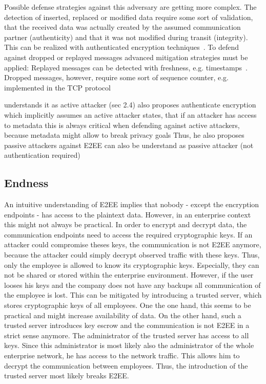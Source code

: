 \documentclass[../main.tex]{subfiles}
\begin{document}
Possible defense strategies against this adversary are getting more complex.
The detection of inserted, replaced or modified data require some sort of validation, that the received data was actually created by the assumed communication partner (authenticity) and that it was not modified during transit (integrity).
This can be realized with authenticated encryption techniques~\cite{Mallory2022}.
To defend against dropped or replayed messages advanced mitigation strategies must be applied:
Replayed messages can be detected with freshness, e.g. timestamps~\cite[419]{Eckert2018}.
Dropped messages, however, require some sort of sequence counter, e.g. implemented in the TCP protocol ~\cite[115]{Eckert2018}


\cite{Mallory2022} understands it as active attacker (sec 2.4)
\cite{Hale2022} also proposes authenticate encryption which implicitly assumes an active attacker
\cite{Nabeel2017} states, that if an attacker has access to metadata this is always critical when defending against active attackers, because metadata might allow to break privacy goals
Thus, he also proposes passive attackers against E2EE can also be understand as passive attacker (not authentication required)


\subsection{Endness}

An intuitive understanding of E2EE implies that nobody - except the encryption endpoints - has access to the plaintext data.
However, in an enterprise context this might not always be practical.
In order to encrypt and decrypt data, the communication endpoints need to access the required cryptographic keys.
If an attacker could compromise theses keys, the communication is not E2EE anymore, because the attacker could simply decrypt observed traffic with these keys.
Thus, only the employee is allowed to know its cryptographic keys.
Especially, they can not be shared or stored within the enterprise environment.
However, if the user looses his keys and the company does not have any backups all communication of the employee is lost.
This can be mitigated by introducing a trusted server, which stores cryptographic keys of all employees.
One the one hand, this seems to be practical and might increase availability of data. 
On the other hand, such a trusted server introduces key escrow and the communication is not E2EE in a strict sense anymore.
The administrator of the trusted server has access to all keys.
Since this administrator is most likely also the administrator of the whole enterprise network, he has access to the network traffic.
This allows him to decrypt the communication between employees.
Thus, the introduction of the trusted server most likely breaks E2EE.
\end{document}
